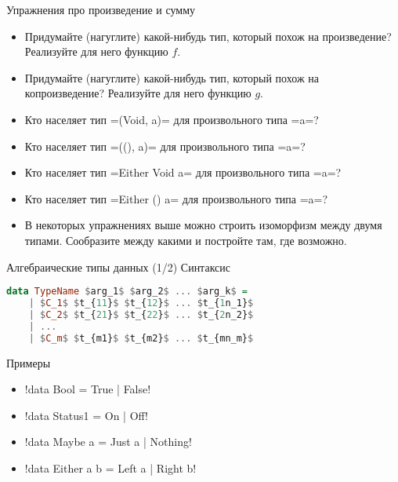 \documentclass{beamer}
\begin{document}
\begin{frame}[fragile]{Упражнения про произведение и сумму}
\begin{itemize}
 \item Придумайте (нагуглите) какой-нибудь тип, который похож на произведение? Реализуйте для него функцию $f$.
 \item Придумайте (нагуглите) какой-нибудь тип, который похож на копроизведение? Реализуйте для него функцию $g$.
 \item Кто населяет тип \hsinline=(Void, a)= для произвольного типа \hsinline=a=?
 \item Кто населяет тип \hsinline=((), a)= для произвольного типа \hsinline=a=?
 \item Кто населяет тип \hsinline=Either Void a= для произвольного типа \hsinline=a=?
 \item Кто населяет тип \myinline=Either ()   a= для произвольного типа \hsinline=a=?
 \item В некоторых упражнениях выше можно строить изоморфизм между двумя типами. Сообразите между какими и постройте там, где возможно.
\end{itemize}

\end{frame}

\begin{frame}[fragile]{Алгебраические типы данных (1/2)}
Синтаксис
 \begin{lstlisting}[mathescape=true,language=haskell]
  data TypeName $arg_1$ $arg_2$ ... $arg_k$ = 
    | $C_1$ $t_{11}$ $t_{12}$ ... $t_{1n_1}$ 
    | $C_2$ $t_{21}$ $t_{22}$ ... $t_{2n_2}$ 
    | ...
    | $C_m$ $t_{m1}$ $t_{m2}$ ... $t_{mn_m}$ 
 \end{lstlisting}
 Примеры
 \begin{itemize}
  \item \hsinline!data Bool    = True | False!
  \item \hsinline!data Status1 = On   | Off!
  \item \hsinline!data Maybe a = Just a | Nothing!
  \item \hsinline!data Either a b = Left a | Right b!
 \end{itemize}
\end{frame}
\end{document}
